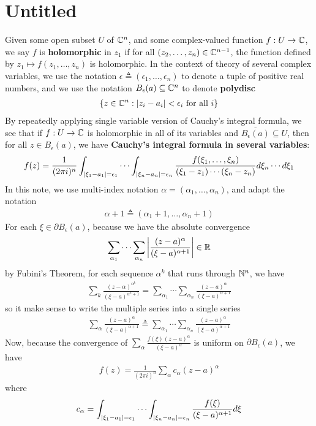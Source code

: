 \documentclass{report}
\begin{document}
\section{Untitled}
Given some open subset $U$ of $\mathbb{C}^n$, and some complex-valued function  $f:U\rightarrow \mathbb{C}$, we say $f$ is \textbf{holomorphic} in $z_1$ if for all  $(z_2,\dots, z_n)\in \mathbb{C}^{n-1}$, the function defined by $z_1 \mapsto f(z_1,\dots ,z_n)$ is holomorphic. In the context of theory of several complex variables, we use the notation $\epsilon \triangleq  (\epsilon_1,\dots ,\epsilon _n)$ to denote a tuple of positive real numbers, and we use the notation $B_\epsilon (a)\subseteq \mathbb{C}^n$ to denote \textbf{polydisc} 
\begin{align*}
\{ z\in\mathbb{C}^n: \left|z_i- a_i\right|<\epsilon_i \text{ for all }i \}
\end{align*}
By repeatedly applying single variable version of Cauchy's integral formula, we see that if $f:U\rightarrow \mathbb{C}$ is holomorphic in all of its variables and $\overline{B_\epsilon (a)}\subseteq U$, then for all $z\in B_\epsilon (a)$, we have \textbf{Cauchy's integral formula in several variables}: 
\begin{align*}
f(z)= \frac{1}{(2\pi i)^n} \int_{\left|\xi_1 - a_1\right|=\epsilon _1}\cdots \int_{\left|\xi_n-a_n\right|= \epsilon_n} \frac{f(\xi_1,\dots ,\xi_n)}{(\xi_1-z_1)\cdots (\xi_n-z_n)}d\xi_n\cdots d\xi_1
\end{align*}
In this note, we use multi-index notation $\alpha = (\alpha _1,\dots ,\alpha _n) $, and adapt the notation 
\begin{align*}
\alpha +1 \triangleq (\alpha_1+1,\dots , \alpha_n+1)
\end{align*}
For each $\xi \in \partial B_\epsilon (a)$, because we have the absolute convergence 
\begin{align*}
  \sum_{\alpha_1 } \cdots \sum_{\alpha _n}  \left| \frac{(z-a)^{\alpha }}{(\xi-a)^{\alpha +1}}\right| \in\mathbb{R}
\end{align*}
by Fubini's Theorem, for each sequence $\alpha^k$ that runs through $\mathbb{N}^n$, we have  
\begin{align*}
\sum_{k} \frac{(z-\alpha )^{\alpha ^k}}{(\xi-a)^{\alpha^k +1}}= \sum_{\alpha _1} \cdots \sum_{\alpha _n} \frac{(z-a)^{\alpha }}{(\xi-a)^{\alpha +1}} 
\end{align*}
so it make sense to write the multiple series into a single series 
\begin{align*}
\sum_{\alpha } \frac{(z-a)^{\alpha }}{(\xi-a)^{\alpha+1}}\triangleq \sum_{\alpha_1 } \cdots \sum_{\alpha _n} \frac{(z-a)^{\alpha }}{(\xi-a)^{\alpha +1}} 
\end{align*}
Now, because the convergence of $\sum_{\alpha } \frac{f(\xi)(z-a)^{\alpha }}{(\xi-a)^{\alpha }}$ is uniform on $\partial B_\epsilon (a)$, we have 
\begin{align*}
f(z)= \frac{1}{(2\pi i)^n} \sum_\alpha c_\alpha (z-a)^{\alpha } 
\end{align*}
where 
 \begin{align*}
c_\alpha = \int_{\left|\xi_1-a_1\right|=\epsilon_1}\cdots \int_{\left|\xi_n-a_n\right|=\epsilon _n} \frac{f(\xi)}{(\xi-a)^{\alpha +1}}d\xi
\end{align*}
\end{document}
